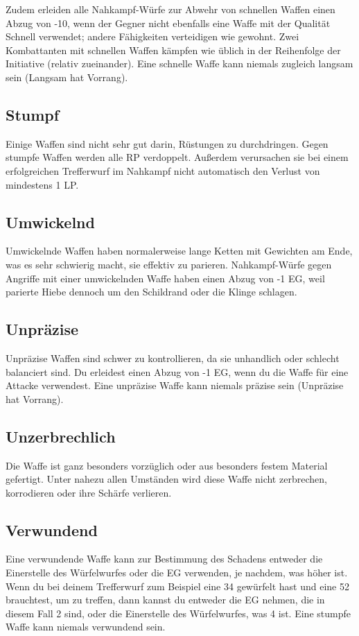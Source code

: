 \documentclass[a4paper, fontsize=9pt twocolumn]{scrartcl}
\begin{document}
\begin{multicols*}{2}
    Zudem erleiden alle Nahkampf-Würfe zur Abwehr von schnellen Waffen einen Abzug von -10, wenn der Gegner nicht ebenfalls eine Waffe mit der Qualität Schnell verwendet; andere Fähigkeiten verteidigen wie gewohnt.
    Zwei Kombattanten mit schnellen Waffen kämpfen wie üblich in der Reihenfolge der Initiative (relativ zueinander).
    Eine schnelle Waffe kann niemals zugleich langsam sein (Langsam hat Vorrang).

    \subsection{Stumpf}
    Einige Waffen sind nicht sehr gut darin, Rüstungen zu durchdringen.
    Gegen stumpfe Waffen werden alle RP verdoppelt.
    Außerdem verursachen sie bei einem erfolgreichen Trefferwurf im Nahkampf nicht automatisch den Verlust von mindestens 1 LP.

    \subsection{Umwickelnd}
    Umwickelnde Waffen haben normalerweise lange Ketten mit Gewichten am Ende, was es sehr schwierig macht, sie effektiv zu parieren.
    Nahkampf-Würfe gegen Angriffe mit einer umwickelnden Waffe haben einen Abzug von -1 EG, weil parierte Hiebe dennoch um den Schildrand oder die Klinge schlagen.

    \subsection{Unpräzise}
    Unpräzise Waffen sind schwer zu kontrollieren, da sie unhandlich oder schlecht balanciert sind.
    Du erleidest einen Abzug von -1 EG, wenn du die Waffe für eine Attacke verwendest.
    Eine unpräzise Waffe kann niemals präzise sein (Unpräzise hat Vorrang).

    \subsection{Unzerbrechlich}
    Die Waffe ist ganz besonders vorzüglich oder aus besonders festem Material gefertigt.
    Unter nahezu allen Umständen wird diese Waffe nicht zerbrechen, korrodieren oder ihre Schärfe verlieren.

    \subsection{Verwundend}
    Eine verwundende Waffe kann zur Bestimmung des Schadens entweder die Einerstelle des Würfelwurfes oder die EG verwenden, je nachdem, was höher ist.
    Wenn du bei deinem Trefferwurf zum Beispiel eine 34 gewürfelt hast und eine 52 brauchtest, um zu treffen, dann kannst du entweder die EG nehmen, die in diesem Fall 2 sind, oder die Einerstelle des Würfelwurfes, was 4 ist. Eine stumpfe Waffe kann niemals verwundend sein.


\end{multicols*}
\end{document}

